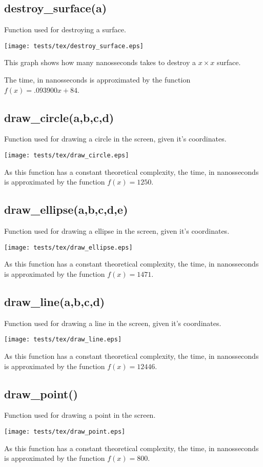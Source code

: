 \documentclass{article}
\begin{document}
\subsection{destroy\_surface(a)}
Function used for destroying a surface.

\texttt{[image: tests/tex/destroy\_surface.eps]}

This graph shows how many nanosseconds takes to destroy a $x \times x$ surface.

The time, in nanosseconds is 
approximated by the function $f(x)=.093900x+84$.
\subsection{draw\_circle(a,b,c,d)}
Function used for drawing a circle in the
screen, given it's coordinates. 

\texttt{[image: tests/tex/draw\_circle.eps]}

As this function has a constant theoretical
complexity, the time, in nanosseconds is 
approximated by the function $f(x)=1250$.
\subsection{draw\_ellipse(a,b,c,d,e)}
Function used for drawing a ellipse in the
screen, given it's coordinates. 

\texttt{[image: tests/tex/draw\_ellipse.eps]}

As this function has a constant theoretical
complexity, the time, in nanosseconds is 
approximated by the function $f(x)=1471$.
\subsection{draw\_line(a,b,c,d)}
Function used for drawing a line in the
screen, given it's coordinates. 

\texttt{[image: tests/tex/draw\_line.eps]}

As this function has a constant theoretical
complexity, the time, in nanosseconds is 
approximated by the function $f(x)=12446$.
\subsection{draw\_point()}
Function used for drawing a point in the screen.


\texttt{[image: tests/tex/draw\_point.eps]}

As this function has a constant theoretical
complexity, the time, in nanosseconds is 
approximated by the function $f(x)=800$.
\end{document}
